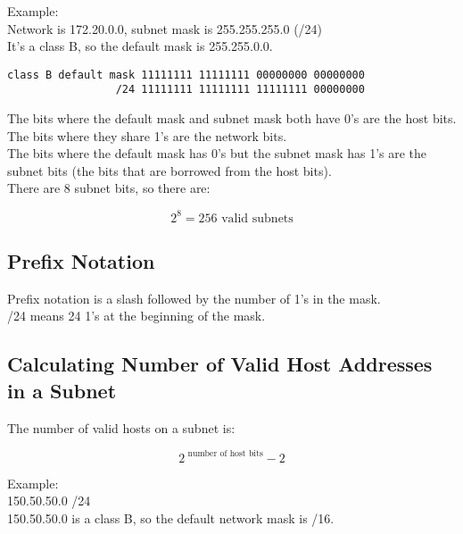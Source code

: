 Example:\\

Network is 172.20.0.0, subnet mask is 255.255.255.0 (/24)\\

It's a class B, so the default mask is 255.255.0.0.

\begin{verbatim}
class B default mask 11111111 11111111 00000000 00000000
                 /24 11111111 11111111 11111111 00000000
\end{verbatim}

The bits where the default mask and subnet mask both have 0's are the host
bits.\\

The bits where they share 1's are the network bits.\\

The bits where the default mask has 0's but the subnet mask has 1's are the
subnet bits (the bits that are borrowed from the host bits).\\

There are 8 subnet bits, so there are:

\begin{equation}
2 ^ 8 = 256 \mbox{ valid subnets}
\end{equation}

\subsection{Prefix Notation}

Prefix notation is a slash followed by the number of 1's in the mask.\\

/24 means 24 1's at the beginning of the mask.

\subsection{Calculating Number of Valid Host Addresses in a Subnet}

The number of valid hosts on a subnet is:

\begin{equation}
2 ^ {\mbox{ number of host bits}} - 2
\end{equation}

Example:\\

150.50.50.0 /24\\

150.50.50.0 is a class B, so the default network mask is /16.

